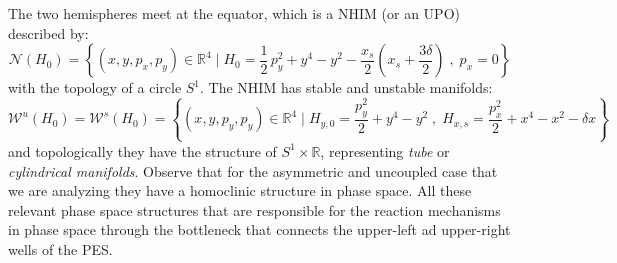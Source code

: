 \documentclass[10pt,aps,onecolumn,superscriptaddress]{revtex4-2}
\begin{document}
The two hemispheres meet at the equator, which is a NHIM (or an UPO) described by:
\begin{equation}
\mathcal{N}(H_0) = \left\{(x,y,p_x,p_y) \in \mathbb{R}^4 \; \bigg| \; H_0 = \frac{1}{2} \, p_y^2 + y^4 - y^2 - \frac{x_s}{2} \left(x_s + \frac{3\delta}{2}\right) \;,\; p_x = 0 \right\}
\end{equation}
with the topology of a circle $S^1$. The NHIM has stable and unstable manifolds:
\begin{equation}
\mathcal{W}^{u}(H_0) = \mathcal{W}^{s}(H_0) = \left\{\left(x,y,p_y,p_y\right) \in \mathbb{R}^4 \; \bigg| \; H_{y,0} = \frac{p_y^2}{2} + y^4 - y^2 \;,\; H_{x,s} = \frac{p_x^2}{2} + x^4 - x^2 - \delta x \right\}
\end{equation}
and topologically they have the structure of $S^1 \times \mathbb{R}$, representing \textit{tube} or \textit{cylindrical manifolds}. Observe that for the asymmetric and uncoupled case that we are analyzing they have a homoclinic structure in phase space. All these relevant phase space structures that are responsible for the reaction mechanisms in phase space through the bottleneck that connects the upper-left ad upper-right wells of the PES.
\end{document}
